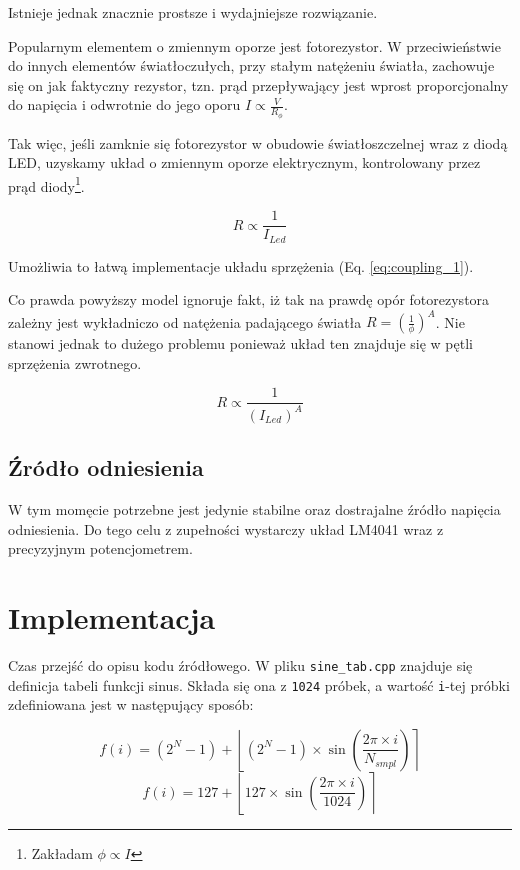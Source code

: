 \documentclass[12pt, a4paper]{article}
\begin{document}
Istnieje jednak znacznie prostsze i wydajniejsze rozwiązanie.

Popularnym elementem o zmiennym oporze jest fotorezystor. W przeciwieństwie do innych elementów
światłoczułych, przy stałym natężeniu światła, zachowuje się on jak faktyczny rezystor,
tzn. prąd przepływający jest wprost proporcjonalny do napięcia i odwrotnie do jego oporu
$I \propto \frac{V}{R_{\phi}}$.

Tak więc, jeśli zamknie się fotorezystor w obudowie światłoszczelnej wraz z diodą LED,
uzyskamy układ o zmiennym oporze elektrycznym, kontrolowany przez prąd diody\footnote{Zakładam $\phi \propto I$}.

\begin{equation}
	R \propto \frac{1}{I_{Led}}
\end{equation}

Umożliwia to łatwą implementacje układu sprzężenia (Eq. \ref{eq:coupling_1}). 

Co prawda powyższy model ignoruje fakt,
iż tak na prawdę opór fotorezystora zależny jest wykładniczo od natężenia padającego światła
$R = \left(\frac{1}{\phi}\right)^A$. Nie stanowi jednak to dużego problemu ponieważ układ ten znajduje się w 
pętli sprzężenia zwrotnego.

\begin{equation}
	R \propto \frac{1}{(I_{Led})^A}
\end{equation}

\subsection{Źródło odniesienia}
W tym momęcie potrzebne jest jedynie stabilne oraz dostrajalne źródło napięcia odniesienia.
Do tego celu z zupełności wystarczy układ LM4041 wraz z precyzyjnym potencjometrem.

\section{Implementacja}
\label{sec:impl}
Czas przejść do opisu kodu źródłowego.
W pliku \verb|sine_tab.cpp| znajduje się definicja tabeli funkcji sinus. Składa się ona z \verb|1024| próbek, a wartość \verb|i|-tej próbki 
zdefiniowana jest w następujący sposób:

\begin{equation}
	f(i) = (2^N - 1) + \left\lfloor (2^N - 1) \times \sin \left(\frac{2 \pi \times i}{N_{smpl}}\right)\right\rceil
\end{equation}
\begin{equation}
	f(i) = 127 + \left\lfloor 127 \times  \sin \left(\frac{2 \pi \times i}{1024}\right)\right\rceil
\end{equation}
\end{document}
